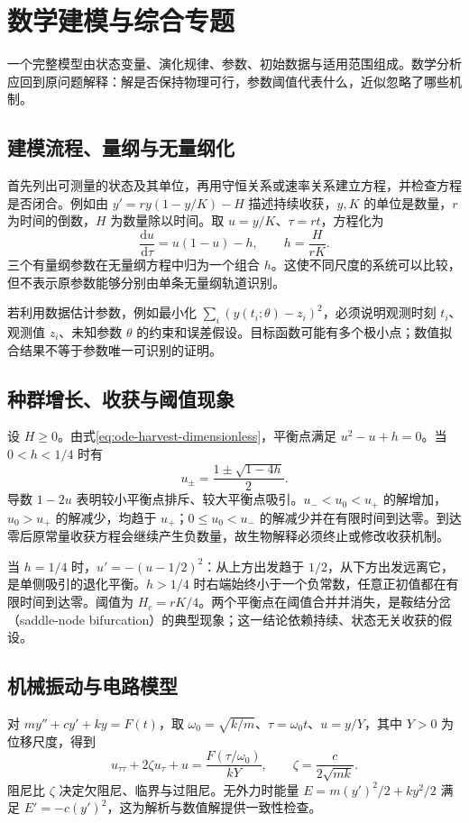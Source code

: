 \setcounter{chapter}{13} %
\chapter{数学建模与综合专题}
\label{chap:ode-modeling}

一个完整模型由状态变量、演化规律、参数、初始数据与适用范围组成。数学分析应回到原问题解释：解是否保持物理可行，参数阈值代表什么，近似忽略了哪些机制。

\section{建模流程、量纲与无量纲化}
首先列出可测量的状态及其单位，再用守恒关系或速率关系建立方程，并检查方程是否闭合。例如由 $y'=ry(1-y/K)-H$ 描述持续收获，$y,K$ 的单位是数量，$r$ 为时间的倒数，$H$ 为数量除以时间。取 $u=y/K$、$\tau=rt$，方程化为
\begin{equation}
 \frac{\mathrm du}{\mathrm d\tau}=u(1-u)-h,\qquad h=\frac{H}{rK}.
 \label{eq:ode-harvest-dimensionless}
\end{equation}
三个有量纲参数在无量纲方程中归为一个组合 $h$。这使不同尺度的系统可以比较，但不表示原参数能够分别由单条无量纲轨道识别。

若利用数据估计参数，例如最小化 $\sum_i(y(t_i;\theta)-z_i)^2$，必须说明观测时刻 $t_i$、观测值 $z_i$、未知参数 $\theta$ 的约束和误差假设。目标函数可能有多个极小点；数值拟合结果不等于参数唯一可识别的证明。

\section{种群增长、收获与阈值现象}
设 $H\geq0$。由式\eqref{eq:ode-harvest-dimensionless}，平衡点满足 $u^2-u+h=0$。当 $0<h<1/4$ 时有
\[
 u_\pm=\frac{1\pm\sqrt{1-4h}}2.
\]
导数 $1-2u$ 表明较小平衡点排斥、较大平衡点吸引。$u_-<u_0<u_+$ 的解增加，$u_0>u_+$ 的解减少，均趋于 $u_+$；$0\leq u_0<u_-$ 的解减少并在有限时间到达零。到达零后原常量收获方程会继续产生负数量，故生物解释必须终止或修改收获机制。

当 $h=1/4$ 时，$u'=-(u-1/2)^2$：从上方出发趋于 $1/2$，从下方出发远离它，是单侧吸引的退化平衡。$h>1/4$ 时右端始终小于一个负常数，任意正初值都在有限时间到达零。阈值为 $H_c=rK/4$。两个平衡点在阈值合并并消失，是鞍结分岔（saddle-node bifurcation）的典型现象；这一结论依赖持续、状态无关收获的假设。

\section{机械振动与电路模型}
对 $my''+cy'+ky=F(t)$，取 $\omega_0=\sqrt{k/m}$、$\tau=\omega_0t$、$u=y/Y$，其中 $Y>0$ 为位移尺度，得到
\[
 u_{\tau\tau}+2\zeta u_\tau+u=\frac{F(\tau/\omega_0)}{kY},\qquad
 \zeta=\frac{c}{2\sqrt{mk}}.
\]
阻尼比 $\zeta$ 决定欠阻尼、临界与过阻尼。无外力时能量 $E=m(y')^2/2+ky^2/2$ 满足 $E'=-c(y')^2$，这为解析与数值解提供一致性检查。

